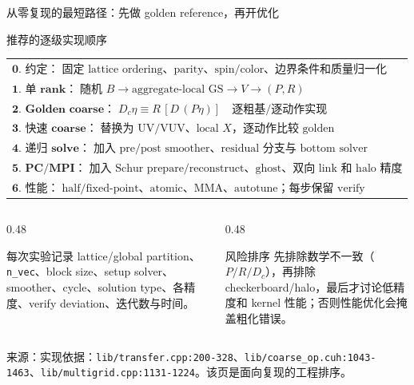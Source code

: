 \documentclass[UTF8,aspectratio=169,11pt]{ctexbeamer}
\newcommand{\source}[1]{\vspace{0.04em}\par\noindent\parbox[t]{0.96\linewidth}{\raggedright\tiny\color{muted}来源：#1\par}}
\newcommand{\codepath}[1]{\nolinkurl{#1}}
\begin{document}
\begin{frame}[t]{从零复现的最短路径：先做 golden reference，再开优化}
  \small
  \begin{block}{推荐的逐级实现顺序}
    \begin{tabular}{@{}l@{}}
      $\textbf{0. 约定：}\;\text{固定 lattice ordering、parity、spin/color、边界条件和质量归一化}$ \\
      $\textbf{1. 单 rank：}\;\text{随机 }B\to\text{aggregate-local GS}\to V\to(P,R)$ \\
      $\textbf{2. Golden coarse：}\;D_c\eta\equiv R\,[D\,(P\eta)]\quad\text{逐粗基/逐动作实现}$ \\
      $\textbf{3. 快速 coarse：}\;\text{替换为 UV/VUV、local }X\text{，逐动作比较 golden}$ \\
      $\textbf{4. 递归 solve：}\;\text{加入 pre/post smoother、residual 分支与 bottom solver}$ \\
      $\textbf{5. PC/MPI：}\;\text{加入 Schur prepare/reconstruct、ghost、双向 link 和 halo 精度}$ \\
      $\textbf{6. 性能：}\;\text{half/fixed-point、atomic、MMA、autotune；每步保留 verify}$
    \end{tabular}
  \end{block}
  \begin{columns}[T,totalwidth=\textwidth]
    \begin{column}{0.48\textwidth}
      \begin{block}{每次实验记录}
        lattice/global partition、\texttt{n\_vec}、block size、setup solver、smoother、cycle、solution type、各精度、verify deviation、迭代数与时间。
      \end{block}
    \end{column}
    \begin{column}{0.48\textwidth}
      \begin{alertblock}{风险排序}
        先排除数学不一致（$P/R/D_c$），再排除 checkerboard/halo，最后才讨论低精度和 kernel 性能；否则性能优化会掩盖粗化错误。
      \end{alertblock}
    \end{column}
  \end{columns}
  \source{实现依据：\codepath{lib/transfer.cpp:200-328}、\codepath{lib/coarse_op.cuh:1043-1463}、\codepath{lib/multigrid.cpp:1131-1224}。该页是面向复现的工程排序。}
\end{frame}
\end{document}
